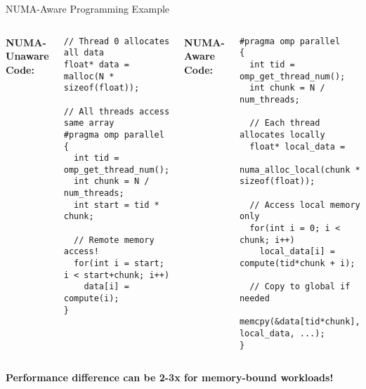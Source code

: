 \documentclass[aspectratio=169,12pt]{beamer}
\begin{document}
\begin{frame}[fragile]{NUMA-Aware Programming Example}
\begin{columns}[T]
\textbf{NUMA-Unaware Code:}
\begin{tcolorbox}[colback=red!5!white, colframe=red!50!black, boxrule=0.5pt, left=1pt, right=1pt, top=1pt, bottom=1pt]
{\scriptsize
\begin{verbatim}
// Thread 0 allocates all data
float* data = malloc(N * sizeof(float));

// All threads access same array
#pragma omp parallel
{
  int tid = omp_get_thread_num();
  int chunk = N / num_threads;
  int start = tid * chunk;
  
  // Remote memory access!
  for(int i = start; i < start+chunk; i++)
    data[i] = compute(i);
}
\end{verbatim}
}
\end{tcolorbox}

\textbf{NUMA-Aware Code:}
\begin{tcolorbox}[colback=green!5!white, colframe=green!50!black, boxrule=0.5pt, left=1pt, right=1pt, top=1pt, bottom=1pt]
{\scriptsize
\begin{verbatim}
#pragma omp parallel
{
  int tid = omp_get_thread_num();
  int chunk = N / num_threads;
  
  // Each thread allocates locally
  float* local_data = 
    numa_alloc_local(chunk * sizeof(float));
  
  // Access local memory only
  for(int i = 0; i < chunk; i++)
    local_data[i] = compute(tid*chunk + i);
    
  // Copy to global if needed
  memcpy(&data[tid*chunk], local_data, ...);
}
\end{verbatim}
}
\end{tcolorbox}
\end{columns}

\vspace{0.3cm}
\textbf{Performance difference can be 2-3x for memory-bound workloads!}
\end{frame}
\end{document}
